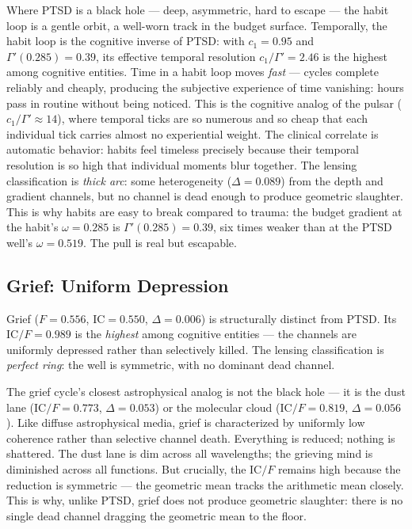 \documentclass[
  aps,
  prd,
  twocolumn,
  superscriptaddress,
  nofootinbib,
  floatfix
]{revtex4-2}
\newcommand{\Gam}{\Gamma}
\newcommand{\IC}{\mathrm{IC}}
\begin{document}
Where PTSD is a black hole --- deep, asymmetric, hard to
escape --- the habit loop is a gentle orbit, a well-worn
track in the budget surface.  Temporally, the habit loop is
the cognitive inverse of PTSD: with $c_1 = 0.95$ and
$\Gam'(0.285) = 0.39$, its effective temporal resolution
$c_1/\Gam' = 2.46$ is the highest among cognitive entities.
Time in a habit loop moves \emph{fast} --- cycles complete
reliably and cheaply, producing the subjective experience
of time vanishing: hours pass in routine without being
noticed.  This is the cognitive analog of the pulsar
($c_1/\Gam' \approx 14$), where temporal ticks are so
numerous and so cheap that each individual tick carries
almost no experiential weight.  The clinical correlate
is automatic behavior: habits feel timeless precisely
because their temporal resolution is so high that
individual moments blur together.  The lensing classification
is \emph{thick arc}: some heterogeneity
($\Delta = 0.089$) from the depth and gradient channels,
but no channel is dead enough to produce geometric
slaughter.  This is why habits are easy to break
compared to trauma: the budget gradient at the habit's
$\omega = 0.285$ is $\Gam'(0.285) = 0.39$, six times
weaker than at the PTSD well's $\omega = 0.519$.  The pull
is real but escapable.


\subsection{Grief: Uniform Depression}

Grief ($F = 0.556$, $\IC = 0.550$, $\Delta = 0.006$) is
structurally distinct from PTSD.  Its $\IC/F = 0.989$ is
the \emph{highest} among cognitive entities --- the channels
are uniformly depressed rather than selectively killed.
The lensing classification is \emph{perfect ring}: the well
is symmetric, with no dominant dead channel.

The grief cycle's closest astrophysical analog is not
the black hole --- it is the dust lane ($\IC/F = 0.773$,
$\Delta = 0.053$) or the molecular cloud ($\IC/F = 0.819$,
$\Delta = 0.056$).  Like diffuse astrophysical media, grief
is characterized by uniformly low coherence rather than
selective channel death.  Everything is reduced;
nothing is shattered.  The dust lane is dim across all
wavelengths; the grieving mind is diminished across all functions.
But crucially, the $\IC/F$ remains high because the
reduction is symmetric --- the geometric mean tracks the
arithmetic mean closely.  This is why, unlike PTSD, grief
does not produce geometric slaughter: there is no single
dead channel dragging the geometric mean to the floor.
\end{document}
